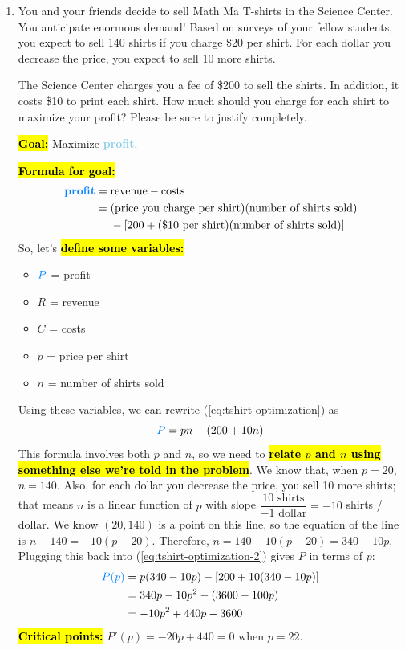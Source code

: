 \documentclass{article}
\newcommand{\highlight}[1]{\boldmath\hl{\textbf{#1}}\unboldmath}
\newcommand{\goal}[1]{\textbf{\textcolor{skyblue}{#1}}}
\theoremstyle{theorem}
\begin{document}
\begin{enumerate}
\item \label{fall2018-prefinal-practice2-4}  

  \begin{problem}[\newpage]
    You and your friends decide to sell Math Ma T-shirts in the Science Center. You anticipate enormous demand! Based on surveys of your fellow students, you expect to sell 140 shirts if you charge \$20 per shirt. For each dollar you decrease the price, you expect to sell 10 more shirts.

    The Science Center charges you a fee of \$200 to sell the shirts. In addition, it costs \$10 to print each shirt. How much should you charge for each shirt to maximize your profit? Please be sure to justify completely. 
  \end{problem}

  \begin{solution}
    \highlight{Goal:} Maximize \goal{profit}.

    \highlight{Formula for goal:}
    \begin{align}
      \text{\goal{profit}} = {} & \text{revenue} - \text{costs} \nonumber \\
      = {} & (\text{price you charge per shirt}) (\text{number of shirts sold}) \nonumber \\
      &- [200 + (\$10\text{ per shirt})(\text{number of shirts sold})] \label{eq:tshirt-optimization}
    \end{align}
    So, let's \highlight{define some variables:}
    \begin{itemize}[nosep]
    \item $\goal{$P$}$ = profit
    \item $R$ = revenue
    \item $C$ = costs
    \item $p$ = price per shirt
    \item $n$ = number of shirts sold
    \end{itemize}
    Using these variables, we can rewrite (\ref{eq:tshirt-optimization}) as
    \begin{equation} \label{eq:tshirt-optimization-2}
      \goal{$P$} = pn - (200 + 10n)
    \end{equation}
    This formula involves both $p$ and $n$, so we need to \highlight{relate $p$ and $n$ using something else we're told in the problem}. We know that, when $p = 20$, $n = 140$. Also, for each dollar you decrease the price, you sell 10 more shirts; that means $n$ is a linear function of $p$ with slope $\dfrac{10 \text{ shirts}}{-1 \text{ dollar}} = -10$ shirts / dollar. We know $(20, 140)$ is a point on this line, so the equation of the line is $n - 140 = -10 (p - 20)$. Therefore, $n = 140 - 10 (p - 20) = 340 - 10p$. Plugging this back into (\ref{eq:tshirt-optimization-2}) gives $P$ in terms of $p$:
    \begin{align*}
      \goal{$P(p)$} &= p (340 - 10p) - [200 + 10 (340 - 10p)] \\
      &= 340p - 10p^2 - (3600 - 100 p) \\
      &= -10 p^2 + 440p - 3600
    \end{align*}
    \highlight{Critical points:} $P'(p) = -20p + 440 = 0$ when $p = 22$.


\end{solution}
\end{enumerate}
\end{document}
